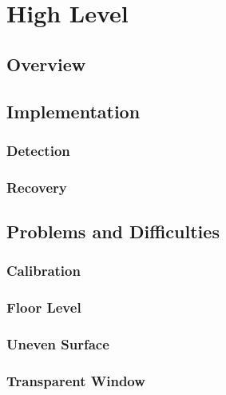 \chapter{High Level}
\section{Overview}
\section{Implementation}
\subsection{Detection}
\subsection{Recovery}
\section{Problems and Difficulties}
\subsection{Calibration}
\subsection{Floor Level}
\subsection{Uneven Surface}
\subsection{Transparent Window}
